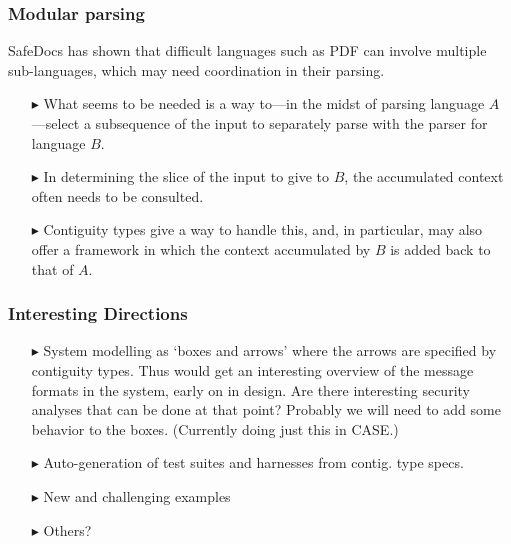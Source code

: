 \documentclass{beamer}
\begin{document}
\begin{frame} \frametitle{Modular parsing}

SafeDocs has shown that difficult languages such as PDF can involve
multiple sub-languages, which may need coordination in their
parsing.

\begin{itemize}

\item [$\blacktriangleright$] What seems to be needed is a way to---in
  the midst of parsing language $A$---select a subsequence of the
  input to separately parse with the parser for language $B$.

\item [$\blacktriangleright$] In
  determining the slice of the input to give to $B$, the accumulated
  context often needs to be consulted.

\item [$\blacktriangleright$] Contiguity types give a way to handle
  this, and, in particular, may also offer a framework in which the
  context accumulated by $B$ is added back to that of $A$.

\end{itemize}

\end{frame}


\begin{frame}\frametitle{Interesting Directions}

\begin{itemize}

\item [$\blacktriangleright$] System modelling as `boxes and arrows'
  where the arrows are specified by contiguity types. Thus would get
  an interesting overview of the message formats in the system, early
  on in design. Are there interesting security analyses that can be
  done at that point? Probably we will need to add some behavior to
  the boxes. (Currently doing just this in CASE.)


\item [$\blacktriangleright$] Auto-generation of test suites and harnesses from contig. type specs.

\item [$\blacktriangleright$] New and challenging examples

\item [$\blacktriangleright$] Others?

\end{itemize}

\end{frame}
\end{document}
